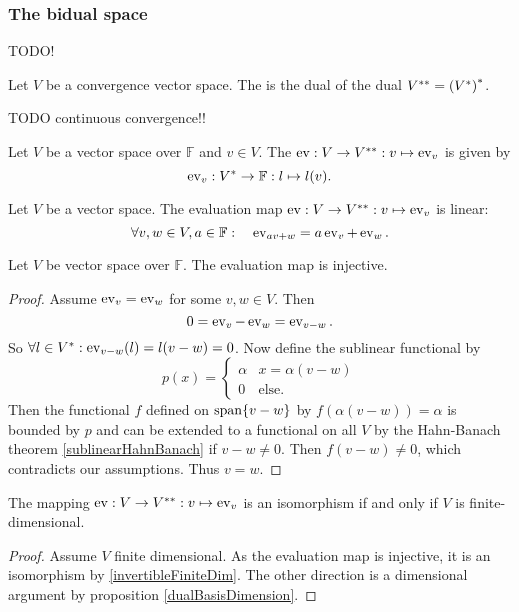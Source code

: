 \subsubsection{The bidual space}
TODO!
\begin{definition}
Let $V$ be a convergence vector space. The  is the dual of the dual ${V}^{**} = {({V}^*)}^*$.
\end{definition}
TODO continuous convergence!!

\begin{definition}
Let $V$ be a vector space over $\mathbb{F}$ and $v\in V$. The  $\operatorname{ev}: V\to {V}^{**}: v\mapsto \operatorname{ev}_v$ is given by
\[ \operatorname{ev}_v: {V}^* \to \mathbb{F}: l\mapsto l(v). \]
\end{definition}

\begin{lemma}
Let $V$ be a vector space. The evaluation map $\operatorname{ev}: V\to {V}^{**}: v\mapsto \operatorname{ev}_v$ is linear:
\[ \forall v,w\in V, a\in\mathbb{F}: \quad \operatorname{ev}_{av + w} = a\operatorname{ev}_v + \operatorname{ev}_w. \]
\end{lemma}
\begin{lemma}
Let $V$ be vector space over $\mathbb{F}$. The evaluation map is injective.
\end{lemma}
\begin{proof}
Assume $\operatorname{ev}_v = \operatorname{ev}_w$ for some $v,w\in V$. Then
\[ 0 = \operatorname{ev}_v - \operatorname{ev}_w  = \operatorname{ev}_{v-w}. \]
So $\forall l\in {V}^*: \operatorname{ev}_{v-w}(l) = l(v-w) = 0$. Now define the sublinear functional by
\[ p(x) = \begin{cases}
\alpha & x = \alpha(v-w) \\
0 & \text{else}.
\end{cases} \]
Then the functional $f$ defined on $\operatorname{span}\{v-w\}$ by $f(\alpha(v-w)) = \alpha$ is bounded by $p$ and can be extended to a functional on all $V$ by the Hahn-Banach theorem \ref{sublinearHahnBanach} if $v-w\neq 0$. Then $f(v-w) \neq 0$, which contradicts our assumptions. Thus $v=w$.
\end{proof}

\begin{proposition}
The mapping $\operatorname{ev}: V\to {V}^{**}: v\mapsto \operatorname{ev}_v$ is an isomorphism \textup{if and only if} $V$ is finite-dimensional.
\end{proposition}
\begin{proof}
Assume $V$ finite dimensional. As the evaluation map is injective, it is an isomorphism by \ref{invertibleFiniteDim}.
The other direction is a dimensional argument by proposition \ref{dualBasisDimension}.
\end{proof}


